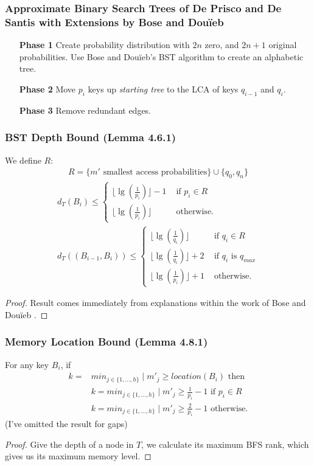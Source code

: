 \documentclass{beamer}
\theoremstyle{plain}
\begin{document}
\begin{frame} \frametitle{Approximate Binary Search Trees of De Prisco and De Santis with Extensions by Bose and Dou\"{i}eb} \label{sec:deBST}

\begin{itemize}
\item[\textbf{Phase 1}] Create probability distribution with $2n$ zero, and $2n+1$ original probabilities. Use Bose and Dou\"{i}eb's BST algorithm to create an alphabetic tree.

\item[\textbf{Phase 2}] Move $p_i$ keys up \textit{starting tree} to the LCA of keys $q_{i-1}$ and $q_i$.

\item[\textbf{Phase 3}] Remove redundant edges.
\end{itemize}
\end{frame}

\begin{frame}\frametitle{BST Depth Bound (Lemma 4.6.1)}
We define $R$:
\begin{align*}
R = \{m' \text{ smallest access probabilities}\} \cup \{q_0, q_n\}
\end{align*}
\begin{align*} 
d_T(B_i) \leq
\begin{cases}  
\lfloor \lg(\frac{1}{p_i}) \rfloor - 1 &\text{ if } p_i \in R  \\
\lfloor \lg(\frac{1}{p_i}) \rfloor &\text{ otherwise.}
\end{cases} \\
d_T((B_{i-1},B_i)) \leq 
\begin{cases}  
\lfloor \lg(\frac{1}{q_i}) \rfloor &\text{ if } q_i \in R  \\
\lfloor \lg(\frac{1}{q_i}) \rfloor + 2 &\text{ if } q_i \text{ is } q_{max} \\
\lfloor \lg(\frac{1}{p_i}) \rfloor + 1 &\text{ otherwise.}
\end{cases}
\end{align*}


\begin{proof}
Result comes immediately from explanations within the work of Bose and Dou\"{i}eb \cite{bose2009efficient}.
\end{proof}

\end{frame}

\begin{frame}\frametitle{Memory Location Bound (Lemma 4.8.1)}
For any key $B_i$, if
\begin{align*}
k=&min_{j \in \{1, ..., h\}} \mid m'_j \geq location(B_i) \text{ then} \\
&k=min_{j \in \{1, ..., h\}} \mid m'_j \geq \frac{1}{p_i}-1 \text{ if } p_i \in R \\
&k=min_{j \in \{1, ..., h\}} \mid m'_j \geq \frac{2}{p_i}-1 \text{ otherwise.}
\end{align*}
(I've omitted the result for gaps)
\begin{proof}
Give the depth of a node in $T$, we calculate its maximum BFS rank, which gives us its maximum memory level.
\end{proof}
\end{frame}
\end{document}
